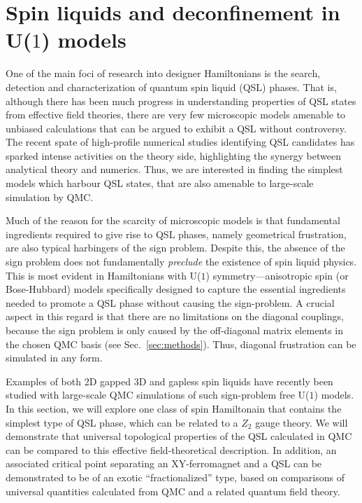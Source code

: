 \documentclass[range]{ar2e}
\begin{document}
\section{Spin liquids and deconfinement in U($1$) models}
\label{sec:u1models}

One of the main foci of research into designer Hamiltonians is the search, detection and characterization of quantum spin liquid (QSL) phases.  That is, although there 
has been much progress in understanding properties of QSL states from effective field theories, there are very few microscopic models amenable to unbiased calculations 
that can be argued to exhibit a QSL without controversy. The recent spate of high-profile numerical studies identifying QSL candidates \cite{Yan, Meng,J1J2} has sparked 
intense activities on the theory side, highlighting the synergy between analytical theory and numerics.
Thus, we are interested in 
finding the simplest models which harbour QSL states, that are also amenable to large-scale simulation by QMC.

Much of the reason for the scarcity of microscopic models is that fundamental ingredients required to give rise to QSL phases, namely geometrical frustration, are also typical 
harbingers of the sign problem.  Despite this, the absence of the sign problem does not fundamentally {\it preclude} the existence of spin liquid physics.  This is most evident 
in Hamiltonians with U($1$) symmetry---anisotropic spin (or Bose-Hubbard) models specifically designed to capture the essential ingredients needed to promote a QSL phase without 
causing the sign-problem. A crucial aspect in this regard is that there are no limitations on the diagonal couplings, because the sign problem is only caused by the off-diagonal
matrix elements in the chosen QMC basis (see Sec.~\ref{sec:methods}). Thus, diagonal frustration can be simulated in any form.

Examples of both 2D gapped \cite{Isakov1,Isakov2,Long,TopoEE} 3D and gapless \cite{Isakov3} spin liquids have recently been studied with large-scale QMC simulations of 
such sign-problem free U($1$) models. In this section, we will explore one class of spin Hamiltonain that contains the simplest type of QSL phase, which can be related to a 
$Z_2$ gauge theory.  We will demonstrate that universal topological properties of the QSL calculated in QMC can be compared to this effective field-theoretical description.  In addition, 
an associated critical point separating an XY-ferromagnet and a QSL can be demonstrated to be of an exotic ``fractionalized'' type, based on comparisons of universal 
quantities calculated from QMC and a related quantum field theory.
\end{document}
